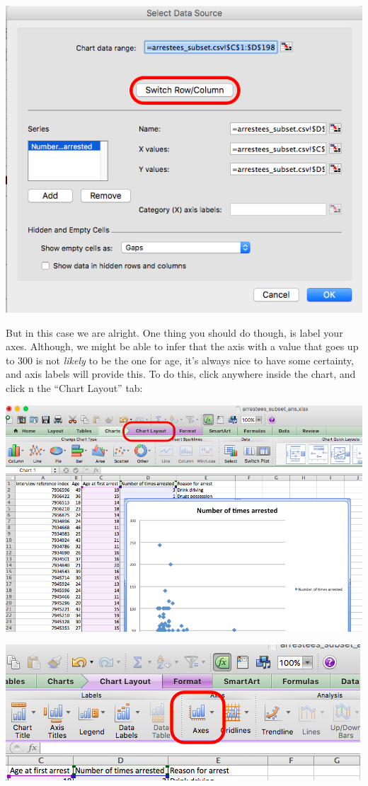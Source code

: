 \documentclass[
]{book}
\begin{document}
\includegraphics{imgs/scatter_5.png}

But in this case we are alright. One thing you should do though, is label your axes. Although, we might be able to infer that the axis with a value that goes up to 300 is not \emph{likely} to be the one for age, it's always nice to have some certainty, and axis labels will provide this. To do this, click anywhere inside the chart, and click n the ``Chart Layout'' tab:

\includegraphics{imgs/scatter_6.png}

\includegraphics{imgs/scatter_7.png}
\end{document}

